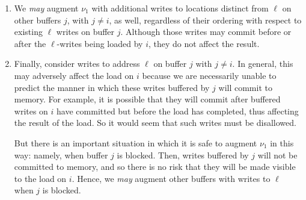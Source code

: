 \documentclass[11pt]{report}
\begin{document}
\begin{enumerate}
  \item We \emph{may} augment $\nu_1$ with additional writes to locations distinct from $\ell$ on other buffers $j$, with $j \neq i$, as well, regardless of their ordering with respect to existing $\ell$ writes on buffer $j$. Although those writes may commit before or after the $\ell$-writes being loaded by $i$, they do not affect the result. 
  
  \item Finally, consider writes to address $\ell$ on buffer $j$ with $j \neq i$. In general, this may adversely affect the load on $i$ because we are necessarily unable to predict the manner in which these writes buffered by $j$ will commit to memory. For example, it is possible that they will commit after buffered writes on $i$ have committed but before the load has completed, thus affecting the result of the load. So it would seem that such writes must be disallowed. 
  
  But there is an important situation in which it is safe to augment $\nu_1$ in this way: namely, when buffer $j$ is blocked. Then, writes buffered by $j$ will not be committed to memory, and so there is no risk that they will be made visible to the load on $i$. Hence, we \emph{may} augment other buffers with writes to $\ell$ when $j$ is blocked. 

\end{enumerate}
\end{document}
